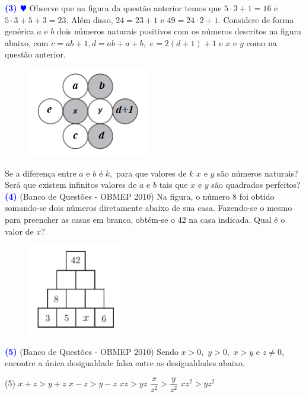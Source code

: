 \documentclass[12pt, a4paper]{article}
\newcommand{\negrito}[1]{\mbox{\boldmath{$#1$}}}
\begin{document}
\textcolor{blue}{\bf(3) $\varheart$} Observe que na figura da questão anterior temos que $5 \cdot 3 + 1 = 16$ e $ 5 \cdot 3 + 5 + 3 = 23.$ Além disso, $24 = 23 + 1$ e $49 = 24 \cdot 2 + 1.$ Considere de forma genérica $a$ e $b$ dois números naturais positivos com os números descritos na figura abaixo, com $c = ab + 1, d = ab + a + b,$ $e = 2(d+1)+1$ e $x$ e $y$ como na questão anterior.
\begin{figure}[!h]
    \centering
    \includegraphics{Listas do PIC/varex2enc1.png}
\end{figure}
Se a diferença entre $a$ e $b$ é $k,$ para que valores de $k$  $x$ e $y$ são números naturais? Será que existem infinitos valores de $a$ e $b$ tais que $x$ e $y$ são quadrados perfeitos?
\newline \newline
\textcolor{blue}{\bf(4)} (Banco de Questões - OBMEP 2010) Na figura, o número $8$ foi obtido somando-se dois números diretamente abaixo de sua casa. Fazendo-se o mesmo para preencher as casas em branco, obtém-se o $42$ na casa indicada. Qual é o valor de $x?$
\begin{figure}[!h]
    \centering
    \includegraphics{Listas do PIC/2encontro1ciclo1.png}
\end{figure}
\newpage
\textcolor{blue}{\bf(5)} (Banco de Questões - OBMEP 2010) Sendo $x > 0,$ $y > 0,$ $x > y$ e $z \neq 0,$ encontre a única desigualdade falsa entre as desigualdades abaixo.
\begin{tasks}[counter-format={(tsk[a])},label-width=3.6ex, label-format = {\bfseries}, column-sep = {0pt}](5)
\task[\textcolor{Floresta}{$\negrito{(a)} $}] $x + z > y + z$
\task[\textcolor{Floresta}{$\negrito{(b)} $}] $x - z > y - z$
\task[\textcolor{Floresta}{$\negrito{(c)} $}] $xz > yz$
\task[\textcolor{Floresta}{$\negrito{(d)} $}] $\dfrac{x}{z^2} > \dfrac{y}{z^2}$
\task[\textcolor{Floresta}{$\negrito{(e)} $}] $xz^2 > yz^2$
\end{tasks}
\end{document}
